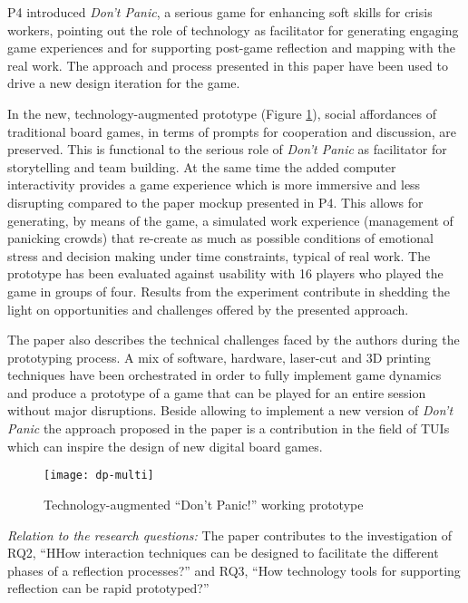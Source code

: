 P4 introduced \emph{Don't Panic}, a serious game for enhancing soft skills for crisis workers, pointing out the role of technology as facilitator for generating engaging game experiences and for supporting post-game reflection and mapping with the real work. The approach and process presented in this paper have been used to drive a new design iteration for the game. 

In the new, technology-augmented prototype (Figure \ref{fig:dp-token}), social affordances of traditional board games, in terms of prompts for cooperation and discussion, are preserved. This is functional to the serious role of \emph{Don't Panic} as facilitator for storytelling and team building. At the same time the added computer interactivity provides a game experience which is more immersive and less disrupting compared to the paper mockup presented in P4. This allows for generating, by means of the game, a simulated work experience (management of panicking crowds) that re-create as much as possible conditions of emotional stress and decision making under time constraints, typical of real work. The prototype has been evaluated against usability with 16 players who played the game in groups of four. Results from the experiment contribute in shedding the light on opportunities and challenges offered by the presented approach.

The paper also describes the technical challenges faced by the authors during the prototyping process. A mix of software, hardware, laser-cut and 3D printing techniques have been orchestrated in order to fully implement game dynamics and produce a prototype of a game that can be played for an entire session without major disruptions. Beside allowing to implement a new version of \emph{Don't Panic} the approach proposed in the paper is a contribution in the field of TUIs which can inspire the design of new digital board games.

\begin{figure}
	[tbh] \centering 
	\texttt{[image: dp-multi]} \caption{Technology-augmented “Don't Panic!” working prototype} \label{fig:dp-token} 
\end{figure}

\emph{Relation to the research questions: } The paper contributes to the investigation of RQ2, ``HHow interaction techniques can be designed to facilitate the different phases of a reflection processes?'' and RQ3, ``How technology tools for supporting reflection can be rapid prototyped?''

